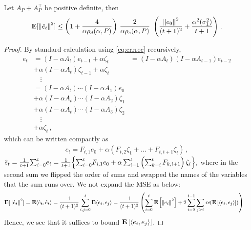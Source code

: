\begin{theorem}\label{th:pdrate}
Let $A_P+A_P^\top$ be positive definite, then
\begin{align}
\mathbf{E}[\left\| \hat{e}_t\right\|^2]
\leq \left(1+\frac4{\alpha\rho_d(\alpha,P)}\right)\, \frac2{\alpha\rho_s(\alpha,P)}\, \,
\left(\frac{\left\| e_0\right\|^2}{(t+1)^2}+ \frac{\alpha^2(\sigma_1^2)}{t+1} \right)\,.
\end{align}
\end{theorem}
\begin{proof}
By standard calculation using \eqref{eq:errrec} recursively, 
\begin{align*}
e_t&=(I-\alpha A_t)e_{t-1}+\alpha \zeta_t
& = (I-\alpha A_t) (I-\alpha A_{t-1}) e_{t-2}\\ &+ \alpha (I-\alpha A_t) \zeta_{t-1} +\alpha \zeta_t \\
& \quad \vdots\\
& = (I-\alpha A_t) \cdots (I-\alpha A_1) e_0\\ &+ \alpha (I-\alpha A_t) \cdots (I-\alpha A_2) \zeta_1 \\
& + \alpha (I-\alpha A_t) \cdots (I-\alpha A_3) \zeta_2\\
&  \quad \vdots \\
&+ \alpha \zeta_t\,,
\end{align*}
which can be written compactly as
\begin{align}
\label{eq:etft}
e_t = F_{t,1} e_0 + \alpha (F_{t,2} \zeta_1 + \dots + F_{t,t+1} \zeta_t )\,,
\end{align}
$\hat{e}_t=\frac{1}{t+1}{\sum}_{i=0}^{t}e_i =\frac{1}{t+1}\Big\{{\sum}_{i=0}^{t} F_{i,1} e_0 + \alpha \sum_{i=1}^{t} \left(\sum_{k=i}^{t} F_{k,i+1} \right)\zeta_i \Big\} ,$
where in the second sum we flipped the order of sums and swapped the names of the variables that the sum runs over.
We not expand the MSE as below:
\begin{align*}
\mathbf{E}[\left\| \hat{e}_t\right\|^2]&=\mathbf{E}\langle\hat{e}_t,\hat{e}_t\rangle=\frac{1}{(t+1)^2} \sum_{i,j=0}^t \mathbf{E}\langle e_i,e_j\rangle= \frac{1}{(t+1)^2}\left(\sum_{i=0}^t \mathbf{E}\left[\left\| e_i\right\|^2\right]+2\sum_{i=0}^{t-1}\sum_{j>i} \emph{re}(\mathbf{E}\left[\langle e_i,e_j\rangle\right])\right)
\end{align*}
Hence, we see that it suffices to bound $\mathbf{E}\left[\langle e_i,  e_j \rangle\right]$.

\end{proof}
